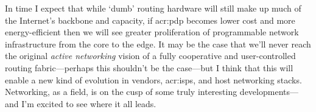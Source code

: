 In time I expect that while `dumb' routing hardware will still make up much of the Internet's backbone and capacity, if \gls{acr:pdp} becomes lower cost and more energy-efficient then we will see greater proliferation of programmable network infrastructure from the core to the edge.
It may be the case that we'll never reach the original \emph{active networking} vision of a fully cooperative and user-controlled routing fabric---perhaps this shouldn't be the case---but I think that this will enable a new kind of evolution in vendors, \glspl{acr:isp}, and host networking stacks.
Networking, as a field, is on the cusp of some truly interesting developments---and I'm excited to see where it all leads.

